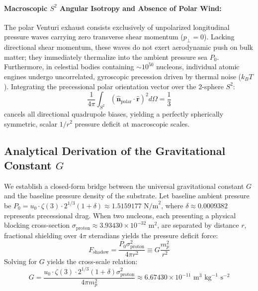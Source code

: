 \documentclass[11pt,a4paper]{article}
\begin{document}
	\paragraph{Macroscopic $S^2$ Angular Isotropy and Absence of Polar Wind:}
	The polar Venturi exhaust consists exclusively of unpolarized longitudinal pressure waves carrying zero transverse shear momentum ($p_\perp = 0$). Lacking directional shear momentum, these waves do not exert aerodynamic push on bulk matter; they immediately thermalize into the ambient pressure sea $P_0$. Furthermore, in celestial bodies containing $\sim 10^{50}$ nucleons, individual atomic engines undergo uncorrelated, gyroscopic precession driven by thermal noise ($k_B T$). Integrating the precessional polar orientation vector over the 2-sphere $S^2$:
	\begin{equation}
		\frac{1}{4\pi} \int_{S^2} (\hat{\mathbf{n}}_{\text{polar}} \cdot \hat{\mathbf{r}})^2 d\Omega = \frac{1}{3}
	\end{equation}
	cancels all directional quadrupole biases, yielding a perfectly spherically symmetric, scalar $1/r^2$ pressure deficit at macroscopic scales.
	
	\subsection{\texorpdfstring{Analytical Derivation of the Gravitational Constant $G$}{Analytical Derivation of the Gravitational Constant G}}
	We establish a closed-form bridge between the universal gravitational constant $G$ and the baseline pressure density of the substrate. Let baseline ambient pressure be $P_0 = u_0 \cdot \zeta(3) \cdot 2^{1/3} (1 + \delta) \approx 1.5159177\text{ N/m}^2$, where $\delta \approx 0.0009382$ represents precessional drag. When two nucleons, each presenting a physical blocking cross-section $\sigma_{\text{proton}} \approx 3.93430 \times 10^{-32}\text{ m}^2$, are separated by distance $r$, fractional shielding over $4\pi$ steradians yields the pressure deficit force:
	\begin{equation}
		F_{\text{shadow}} = \frac{P_0 \sigma_{\text{proton}}^2}{4\pi r^2} \equiv G \frac{m_p^2}{r^2}
	\end{equation}
	Solving for $G$ yields the cross-scale relation:
	\begin{equation}
		G = \frac{u_0 \cdot \zeta(3) \cdot 2^{1/3} (1 + \delta) \sigma_{\text{proton}}^2}{4\pi m_p^2} \approx 6.67430 \times 10^{-11} \text{ m}^3 \text{ kg}^{-1} \text{ s}^{-2}
	\end{equation}
	
\end{document}
